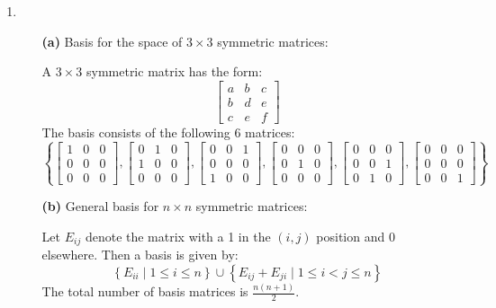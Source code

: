 \documentclass[12pt]{article}
\begin{document}
\begin{enumerate}
\item
\begin{enumerate}
    \item[\textbf{(a)}] Basis for the space of \( 3 \times 3 \) symmetric matrices:

    A \( 3 \times 3 \) symmetric matrix has the form:
    \[
    \begin{bmatrix}
    a & b & c \\
    b & d & e \\
    c & e & f
    \end{bmatrix}
    \]
    The basis consists of the following 6 matrices:
    \[
    \left\{
    \begin{bmatrix}
    1 & 0 & 0 \\ 0 & 0 & 0 \\ 0 & 0 & 0
    \end{bmatrix},
    \begin{bmatrix}
    0 & 1 & 0 \\ 1 & 0 & 0 \\ 0 & 0 & 0
    \end{bmatrix},
    \begin{bmatrix}
    0 & 0 & 1 \\ 0 & 0 & 0 \\ 1 & 0 & 0
    \end{bmatrix},
    \begin{bmatrix}
    0 & 0 & 0 \\ 0 & 1 & 0 \\ 0 & 0 & 0
    \end{bmatrix},
    \begin{bmatrix}
    0 & 0 & 0 \\ 0 & 0 & 1 \\ 0 & 1 & 0
    \end{bmatrix},
    \begin{bmatrix}
    0 & 0 & 0 \\ 0 & 0 & 0 \\ 0 & 0 & 1
    \end{bmatrix}
    \right\}
    \]

    \item[\textbf{(b)}] General basis for \( n \times n \) symmetric matrices:

    Let \( E_{ij} \) denote the matrix with a 1 in the \((i,j)\) position and 0 elsewhere.  
    Then a basis is given by:
    \[
    \left\{ E_{ii} \mid 1 \le i \le n \right\} \cup \left\{ E_{ij} + E_{ji} \mid 1 \le i < j \le n \right\}
    \]
    The total number of basis matrices is \( \frac{n(n+1)}{2} \).


\end{enumerate}
\end{enumerate}
\end{document}
